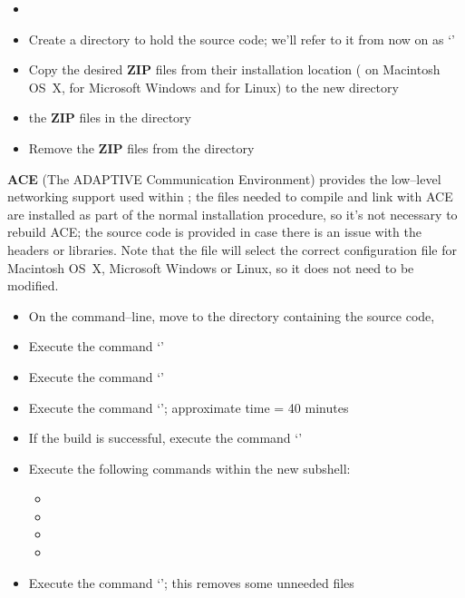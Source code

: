 \tertiaryEnd{}
\begin{itemize}
\item \TBD{}
\end{itemize}
\tertiaryEnd{}
\secondaryEnd{}
\begin{itemize}
\item Create a directory to hold the source code; we'll refer to it from now on as
`'
\item Copy the desired \textbf{ZIP} files from their installation location
( on Macintosh OS~X, \TBD{} for Microsoft Windows and \TBD{} for
Linux) to the new directory 
\item {} the \textbf{ZIP} files in the directory 
\item Remove the \textbf{ZIP} files from the  directory
\end{itemize}
\secondaryEnd{}
\textbf{ACE} (The ADAPTIVE Communication Environment) provides the low--level networking
support used within \mplusm{}; the files needed to compile and link with ACE are installed
as part of the normal \mplusm{} installation procedure, so it's not necessary to rebuild
ACE; the source code is provided in case there is an issue with the headers or libraries.
Note that the file  will select the correct
configuration file for Macintosh OS~X, Microsoft Windows or Linux, so it does not need to
be modified.
\begin{itemize}
\item On the command--line, move to the directory containing the \mplusm{} source code,
\item Execute the command `'
\item Execute the command `'
\item Execute the command `'; approximate time = 40 minutes
\item If the build is successful, execute the command `'
\item Execute the following commands within the new subshell:
\begin{itemize}
\item {}
\item {}
\item {}
\item {}
\end{itemize}
\item Execute the command `'; this removes some unneeded
files
\end{itemize}
